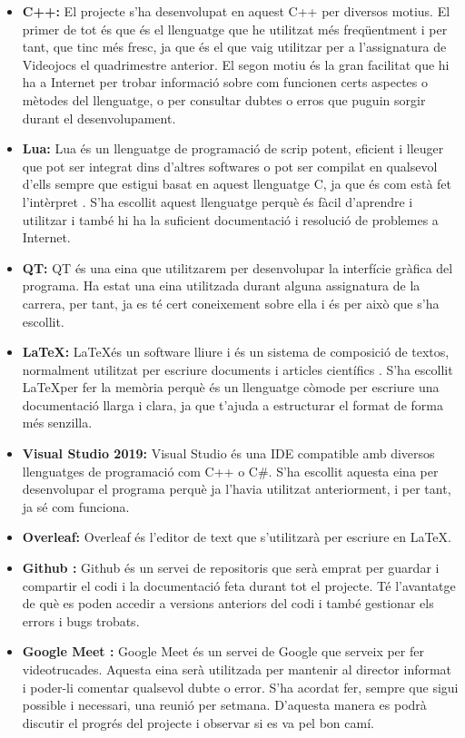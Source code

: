 \documentclass[a4paper]{article}
\begin{document}
\begin{itemize}
    \item \textbf{C++:} El projecte s'ha desenvolupat en aquest C++ per diversos motius. El primer de tot és que és el llenguatge que he utilitzat més freqüentment i per tant, que tinc més fresc, ja que és el que vaig utilitzar per a l'assignatura de Videojocs el quadrimestre anterior. El segon motiu és la gran facilitat que hi ha a Internet per trobar informació sobre com funcionen certs aspectes o mètodes del llenguatge, o per consultar dubtes o erros que puguin sorgir durant el desenvolupament. 
    \item \textbf{Lua:} Lua és un llenguatge de programació de scrip potent, eficient i lleuger que pot ser integrat dins d'altres softwares o pot ser compilat en qualsevol d'ells sempre que estigui basat en aquest llenguatge C, ja que és com està fet l'intèrpret \cite{luaAbout}. S'ha escollit aquest llenguatge perquè és fàcil d'aprendre i utilitzar i també hi ha la suficient documentació i resolució de problemes a Internet.
    \item \textbf{QT:} QT és una eina que utilitzarem per desenvolupar la interfície gràfica del programa. Ha estat una eina utilitzada durant alguna assignatura de la carrera, per tant, ja es té cert coneixement sobre ella i és per això que s'ha escollit. 
    \item \textbf{\LaTeX:} \LaTeX és un software lliure i és un sistema de composició de textos, normalment utilitzat per escriure documents i articles científics \cite{wikipediaLatex}. S'ha escollit \LaTeX per fer la memòria perquè és un llenguatge còmode per escriure una documentació llarga i clara, ja que t'ajuda a estructurar el format de forma més senzilla.
    \item \textbf{Visual Studio 2019:} Visual Studio és una IDE compatible amb diversos llenguatges de programació com C++ o C\#. S'ha escollit aquesta eina per desenvolupar el programa perquè ja l'havia utilitzat anteriorment, i per tant, ja sé com funciona.  
    \item \textbf{Overleaf:} Overleaf és l'editor de text que s'utilitzarà per escriure en \LaTeX.
    \item \textbf{Github \cite{Github}:} Github és un servei de repositoris que serà emprat per guardar i compartir el codi i la documentació feta durant tot el projecte. Té l'avantatge de què es poden accedir a versions anteriors del codi i també gestionar els errors i bugs trobats. 
    \item \textbf{Google Meet \cite{GoogleMeet}:} Google Meet és un servei de Google que serveix per fer videotrucades. Aquesta eina serà utilitzada per mantenir al director informat i poder-li comentar qualsevol dubte o error. S'ha acordat fer, sempre que sigui possible i necessari, una reunió per setmana. D'aquesta manera es podrà discutir el progrés del projecte i observar si es va pel bon camí.
    
\end{itemize}
\end{document}
